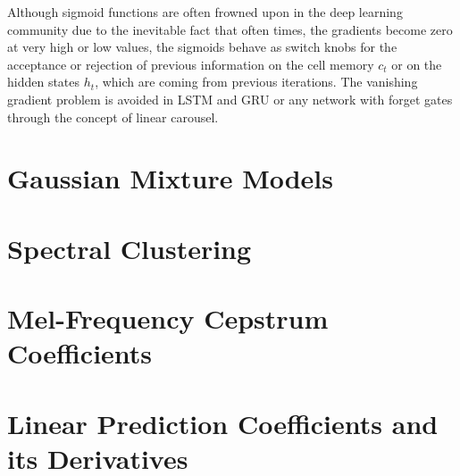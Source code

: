 \begin{appendices}
Although sigmoid functions are often frowned upon in the deep learning community due to the inevitable fact that often times, the gradients become zero at very high or low values, the sigmoids behave as switch knobs for the acceptance or rejection of previous information on the cell memory $c_t$ or on the hidden states $h_t$, which are coming from previous iterations. The vanishing gradient problem is avoided in LSTM and GRU or any network with forget gates through the concept of linear carousel. 
\section{Gaussian Mixture Models} \label{app:gmm}


\section{Spectral Clustering} \label{app:spectralclustering}
\section{Mel-Frequency Cepstrum Coefficients}
\section{Linear Prediction Coefficients and its Derivatives}

\end{appendices}
